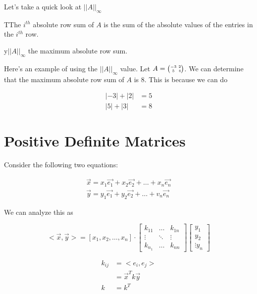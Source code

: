 	Let's take a quick look at $| | A | |_\infty$

	\begin{definition}
		TThe $i^{th}$ absolute row sum of $A$ is the sum of the absolute values of the entries in the $i^{th}$ row.
	\end{definition}

	\begin{theorem}
		y$| | A | |_\infty$ the maximum absolute row sum.
	\end{theorem}

	Here's an example of using the $| | A | |_\infty$ value. Let $A=\SmallMatrix{-3&2\\5&4}$. We can determine that the maximum absolute row sum of $A$ is 8. This is because we can do 

	\begin{align}
		|-3|+|2|&=5\\
		|5|+|3|&=\boxed{8}
	\end{align}
\section{Positive Definite Matrices}

	Consider the following two equations:

	\begin{align}
		\vec{x}=x_1\vec{e_1}+x_2\vec{e_2}+\ldots+x_n\vec{e_n}\\
		\vec{y}=y_1\vec{e_1}+y_2\vec{e_2}+\ldots+v_n\vec{e_n}
	\end{align}

	We can analyze this as 

	\begin{equation}
		<\vec{x},\vec{y}> = [x_1,x_2,\ldots,x_n]\cdot \begin{bmatrix} k_{11}&\ldots&k_{1n}\\ \vdots&\ddots&\vdots\\ k_{n_1}&\ldots&k_{nn} \end{bmatrix} \begin{bmatrix} y_1\\y_2\\ \vdots y_n \end{bmatrix} 
	\end{equation}

	\begin{align}
		k_{ij}&= <e_i,e_j>\\
		&=\vec{x}^Tk\vec{y}\\
		k&=k^T
	\end{align}

